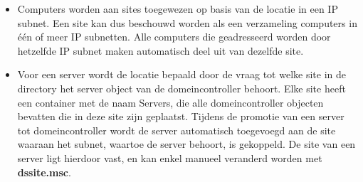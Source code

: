 \begin{enumerate}
		 { 
			\begin{itemize}
				\item Computers worden aan sites toegewezen op basis van de locatie in een IP subnet. Een site kan dus beschouwd worden als een verzameling computers in één of meer IP subnetten. Alle computers die geadresseerd worden door hetzelfde IP subnet maken automatisch deel uit van dezelfde site.
				\item Voor een server wordt de locatie bepaald door de vraag tot welke site in de directory het server object van de domeincontroller behoort. Elke site heeft een container met de naam Servers, die alle domeincontroller objecten bevatten die in deze site zijn geplaatst. Tijdens de promotie van een server tot domeincontroller wordt de server automatisch toegevoegd aan de site waaraan het subnet, waartoe de server behoort, is gekoppeld. De site van een server ligt hierdoor vast, en kan enkel manueel veranderd worden met \textbf{dssite.msc}.
			\end{itemize}
		}
	\end{enumerate}
	
